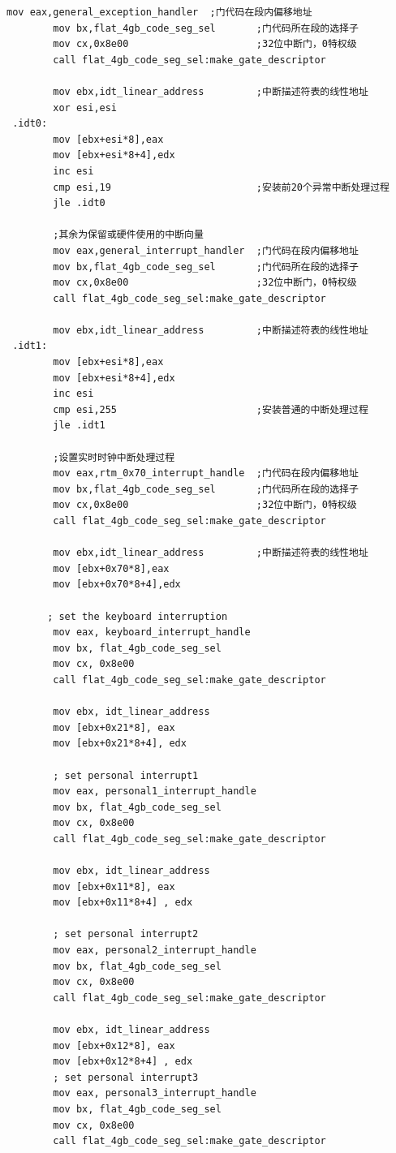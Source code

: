 \documentclass[a4paper,11pt,UTF8]{ctexart}
\begin{document}
	\begin{lstlisting}[caption={安装 IDT},tabsize=4,basicstyle=\footnotesize,captionpos=b]
		mov eax,general_exception_handler  ;门代码在段内偏移地址
		mov bx,flat_4gb_code_seg_sel       ;门代码所在段的选择子
		mov cx,0x8e00                      ;32位中断门，0特权级
		call flat_4gb_code_seg_sel:make_gate_descriptor

		mov ebx,idt_linear_address         ;中断描述符表的线性地址
		xor esi,esi
 .idt0:
		mov [ebx+esi*8],eax
		mov [ebx+esi*8+4],edx
		inc esi
		cmp esi,19                         ;安装前20个异常中断处理过程
		jle .idt0

		;其余为保留或硬件使用的中断向量
		mov eax,general_interrupt_handler  ;门代码在段内偏移地址
		mov bx,flat_4gb_code_seg_sel       ;门代码所在段的选择子
		mov cx,0x8e00                      ;32位中断门，0特权级
		call flat_4gb_code_seg_sel:make_gate_descriptor

		mov ebx,idt_linear_address         ;中断描述符表的线性地址
 .idt1:
		mov [ebx+esi*8],eax
		mov [ebx+esi*8+4],edx
		inc esi
		cmp esi,255                        ;安装普通的中断处理过程
		jle .idt1

		;设置实时时钟中断处理过程
		mov eax,rtm_0x70_interrupt_handle  ;门代码在段内偏移地址
		mov bx,flat_4gb_code_seg_sel       ;门代码所在段的选择子
		mov cx,0x8e00                      ;32位中断门，0特权级
		call flat_4gb_code_seg_sel:make_gate_descriptor

		mov ebx,idt_linear_address         ;中断描述符表的线性地址
		mov [ebx+0x70*8],eax
		mov [ebx+0x70*8+4],edx

	   ; set the keyboard interruption
		mov eax, keyboard_interrupt_handle
		mov bx, flat_4gb_code_seg_sel
		mov cx, 0x8e00
		call flat_4gb_code_seg_sel:make_gate_descriptor

		mov ebx, idt_linear_address
		mov [ebx+0x21*8], eax
		mov [ebx+0x21*8+4], edx

		; set personal interrupt1
		mov eax, personal1_interrupt_handle
		mov bx, flat_4gb_code_seg_sel
		mov cx, 0x8e00
		call flat_4gb_code_seg_sel:make_gate_descriptor

		mov ebx, idt_linear_address
		mov [ebx+0x11*8], eax
		mov [ebx+0x11*8+4] , edx

		; set personal interrupt2
		mov eax, personal2_interrupt_handle
		mov bx, flat_4gb_code_seg_sel
		mov cx, 0x8e00
		call flat_4gb_code_seg_sel:make_gate_descriptor

		mov ebx, idt_linear_address
		mov [ebx+0x12*8], eax
		mov [ebx+0x12*8+4] , edx
		; set personal interrupt3
		mov eax, personal3_interrupt_handle
		mov bx, flat_4gb_code_seg_sel
		mov cx, 0x8e00
		call flat_4gb_code_seg_sel:make_gate_descriptor


\end{lstlisting}
\end{document}

